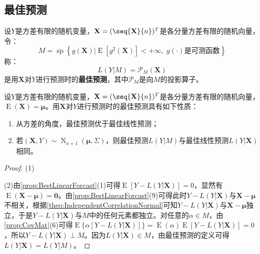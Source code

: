 \subsection{最佳预测}
\begin{definition}
	设$Y$是方差有限的随机变量，$\mathbf{X}=(\seq{\mathbf{X}}{n})^T$是各分量方差有限的随机向量，令：
	\begin{equation*}
		M=\overline{\operatorname{sp}}\left\{g(\mathbf{X})|\operatorname{E}[g^2(\mathbf{X})]<+\infty,\;g(\cdot)\text{是可测函数}\right\}
	\end{equation*}
	称：
	\begin{equation*}
		L(Y|M)=\mathcal{P}_M(\mathbf{X})
	\end{equation*}
	是用$\mathbf{X}$对$Y$进行预测时的\textbf{最佳预测}，其中$\mathcal{P}_M$是向$M$的投影算子。
\end{definition}
\begin{property}
	设$Y$是方差有限的随机变量，$\mathbf{X}=(\seq{\mathbf{X}}{n})^T$是各分量方差有限的随机向量，$\operatorname{E}(\mathbf{X})=\boldsymbol{\mu}$。用$\mathbf{X}$对$Y$进行预测时的最佳预测具有如下性质：
	\begin{enumerate}
		\item 从方差的角度，最佳预测优于最佳线性预测；
		\item 若$(\mathbf{X},Y)\sim\operatorname{N}_{n+1}(\boldsymbol{\mu},\Sigma)$，则最佳预测$L(Y|M)$与最佳线性预测$L(Y|\mathbf{X})$相同。
	\end{enumerate}
\end{property}
\begin{proof}
	(1)\par
	(2)由\cref{prop:BestLinearForcast}(1)可得$\operatorname{E}[Y-L(Y|\mathbf{X})]=0$，显然有$\operatorname{E}(\mathbf{X}-\boldsymbol{\mu})=\mathbf{0}$。由\cref{prop:BestLinearForcast}(9)可得此时$Y-L(Y|\mathbf{X})$与$\mathbf{X}-\boldsymbol{\mu}$不相关，根据\cref{theo:IndependentCorrelationNormal}可知$Y-L(Y|\mathbf{X})$与$\mathbf{X}-\boldsymbol{\mu}$独立，于是$Y-L(Y|\mathbf{X})$与$M$中的任何元素都独立。对任意的$\alpha\in M$，由\cref{prop:CovMat}(6)可得$\operatorname{E}\{\alpha[Y-L(Y|\mathbf{X})]\}=\operatorname{E}(\alpha)\operatorname{E}[Y-L(Y|\mathbf{X})]=0$，所以$Y-L(Y|\mathbf{X})\perp M$。因为$L(Y|\mathbf{X})\in M$，由最佳预测的定义可得$L(Y|\mathbf{X})=L(Y|M)$。
\end{proof}

